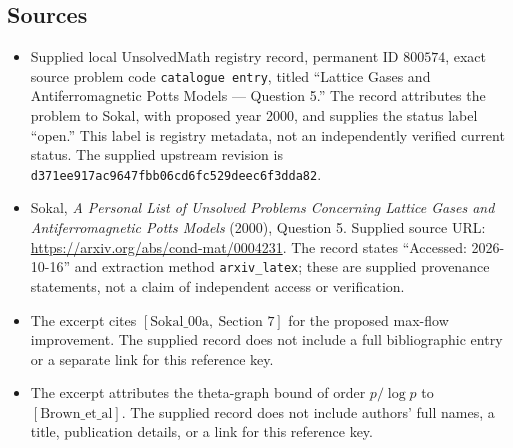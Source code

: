 \documentclass[11pt]{article}
\begin{document}
\subsection{Sources}
\begin{itemize}
\item Supplied local UnsolvedMath registry record, permanent ID \(800574\), exact source problem code \texttt{catalogue entry}, titled ``Lattice Gases and Antiferromagnetic Potts Models --- Question 5.'' The record attributes the problem to Sokal, with proposed year 2000, and supplies the status label ``open.'' This label is registry metadata, not an independently verified current status. The supplied upstream revision is \texttt{d371ee917ac9647fbb06cd6fc529deec6f3dda82}.
\item Sokal, \emph{A Personal List of Unsolved Problems Concerning Lattice Gases and Antiferromagnetic Potts Models} (2000), Question 5. Supplied source URL: \url{https://arxiv.org/abs/cond-mat/0004231}. The record states ``Accessed: 2026-10-16'' and extraction method \texttt{arxiv\_latex}; these are supplied provenance statements, not a claim of independent access or verification.
\item The excerpt cites \([\mathrm{Sokal\_00a},\ \text{Section }7]\) for the proposed max-flow improvement. The supplied record does not include a full bibliographic entry or a separate link for this reference key.
\item The excerpt attributes the theta-graph bound of order \(p/\log p\) to \([\mathrm{Brown\_et\_al}]\). The supplied record does not include authors' full names, a title, publication details, or a link for this reference key.
\end{itemize}
\end{document}
